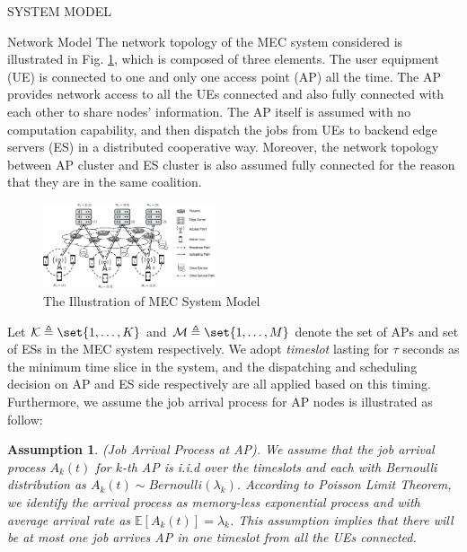 \documentclass[10pt, conference, letterpaper]{IEEEtran}
\newtheorem{assumption}{Assumption}
\DeclarePairedDelimiter\set\{\}
\begin{document}
    \begin{section}{SYSTEM MODEL}
        \label{sec:model}
        \begin{subsection}{Network Model}
            The network topology of the MEC system considered is illustrated in Fig. \ref{fig:system}, which is composed of three elements. The user equipment (UE) is connected to one and only one access point (AP) all the time. The AP provides network access to all the UEs connected and also fully connected with each other to share nodes' information. The AP itself is assumed with no computation capability, and then dispatch the jobs from UEs to backend edge servers (ES) in a distributed cooperative way. Moreover, the network topology between AP cluster and ES cluster is also assumed fully connected for the reason that they are in the same coalition.
            \begin{figure}[ht]
                \centering
                \includegraphics[width=0.45\textwidth, trim={0.5cm 0.5cm 0.5cm 0.5cm}, clip]{system-model.pdf}
                \caption{The Illustration of MEC System Model}
                \label{fig:system}
            \end{figure}

            Let $\mathcal{K} \triangleq \set{1,\dots,K}$ and $\mathcal{M} \triangleq \set{1,\dots,M}$ denote the set of APs and set of ESs in the MEC system respectively. We adopt \emph{timeslot} lasting for $\tau$ seconds as the minimum time slice in the system, and the dispatching and scheduling decision on AP and ES side respectively are all applied based on this timing. Furthermore, we assume the job arrival process for AP nodes is illustrated as follow:
            \begin{assumption}
                (Job Arrival Process at AP).
                We assume that the job arrival process $A_k(t)$ for $k$-th AP is i.i.d over the timeslots and each with Bernoulli distribution as $A_k(t) \sim Bernoulli(\lambda_k)$.  According to Poisson Limit Theorem, we identify the arrival process as memory-less exponential process and with average arrival rate as $\mathbb{E}[A_k(t)] = \lambda_k$.
                This assumption implies that there will be at most one job arrives AP in one timeslot from all the UEs connected.
            \end{assumption}


\end{subsection}
\end{section}
\end{document}
